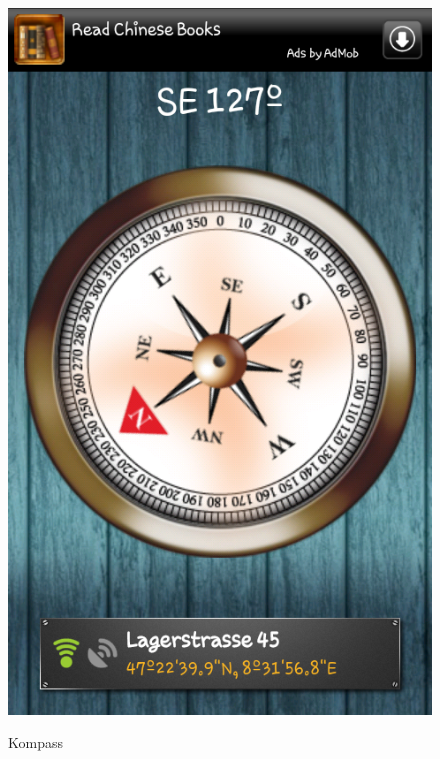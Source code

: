 \begin{figure}[H]
	\centering			      
        \includegraphics[scale=0.35, trim=5mm 6cm 5mm 6cm, clip]{images/kompass.png}\\
		\caption{Kompass}
	\label{fig:kompass}
\end{figure}

